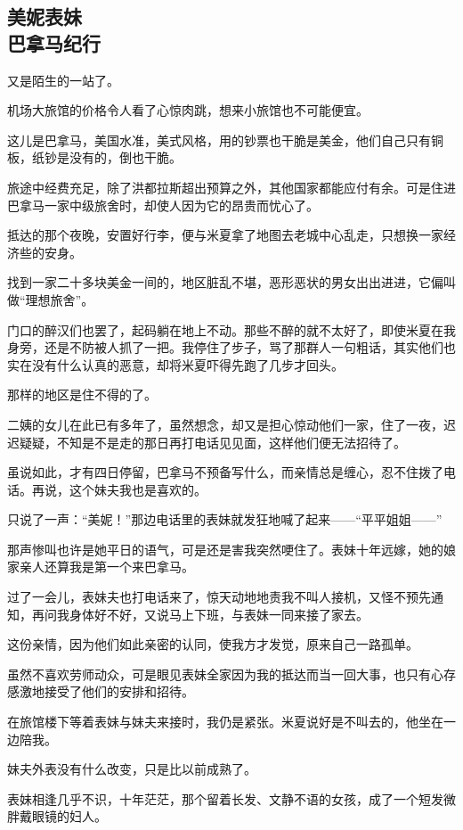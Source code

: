 \subsection{美妮表妹\\\small{巴拿马纪行}}

\par 又是陌生的一站了。
\par 机场大旅馆的价格令人看了心惊肉跳，想来小旅馆也不可能便宜。
\par 这儿是巴拿马，美国水准，美式风格，用的钞票也干脆是美金，他们自己只有铜板，纸钞是没有的，倒也干脆。
\par 旅途中经费充足，除了洪都拉斯超出预算之外，其他国家都能应付有余。可是住进巴拿马一家中级旅舍时，却使人因为它的昂贵而忧心了。
\par 抵达的那个夜晚，安置好行李，便与米夏拿了地图去老城中心乱走，只想换一家经济些的安身。
\par 找到一家二十多块美金一间的，地区脏乱不堪，恶形恶状的男女出出进进，它偏叫做“理想旅舍”。
\par 门口的醉汉们也罢了，起码躺在地上不动。那些不醉的就不太好了，即使米夏在我身旁，还是不防被人抓了一把。我停住了步子，骂了那群人一句粗话，其实他们也实在没有什么认真的恶意，却将米夏吓得先跑了几步才回头。
\par 那样的地区是住不得的了。
\par 二姨的女儿在此已有多年了，虽然想念，却又是担心惊动他们一家，住了一夜，迟迟疑疑，不知是不是走的那日再打电话见见面，这样他们便无法招待了。
\par 虽说如此，才有四日停留，巴拿马不预备写什么，而亲情总是缠心，忍不住拨了电话。再说，这个妹夫我也是喜欢的。
\par 只说了一声：“美妮！”那边电话里的表妹就发狂地喊了起来——“平平姐姐——”
\par 那声惨叫也许是她平日的语气，可是还是害我突然哽住了。表妹十年远嫁，她的娘家亲人还算我是第一个来巴拿马。
\par 过了一会儿，表妹夫也打电话来了，惊天动地地责我不叫人接机，又怪不预先通知，再问我身体好不好，又说马上下班，与表妹一同来接了家去。
\par 这份亲情，因为他们如此亲密的认同，使我方才发觉，原来自己一路孤单。
\par 虽然不喜欢劳师动众，可是眼见表妹全家因为我的抵达而当一回大事，也只有心存感激地接受了他们的安排和招待。
\par 在旅馆楼下等着表妹与妹夫来接时，我仍是紧张。米夏说好是不叫去的，他坐在一边陪我。
\par 妹夫外表没有什么改变，只是比以前成熟了。
\par 表妹相逢几乎不识，十年茫茫，那个留着长发、文静不语的女孩，成了一个短发微胖戴眼镜的妇人。
